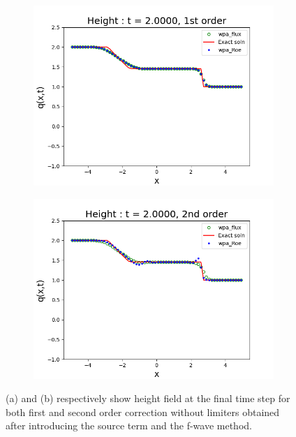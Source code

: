 \documentclass[12pt,a4paper]{article}
\begin{document}
	\begin{figure}[H]
		\begin{subfigure}[b]{0.5\textwidth}
			\centering
			\includegraphics[width=1.0\linewidth]{images/f1}
			\caption{}
			\label{fig:f1}
		\end{subfigure}
		\begin{subfigure}[b]{0.5\textwidth}
			\centering
			\includegraphics[width=1.0\linewidth]{images/f2}
			\caption{}
			\label{fig:f2}
		\end{subfigure}
		\caption{(a) and (b) respectively show height field at the final time step for both first and second order correction without limiters obtained after introducing the source term and the f-wave method. }
	\end{figure}
	
\end{document}
